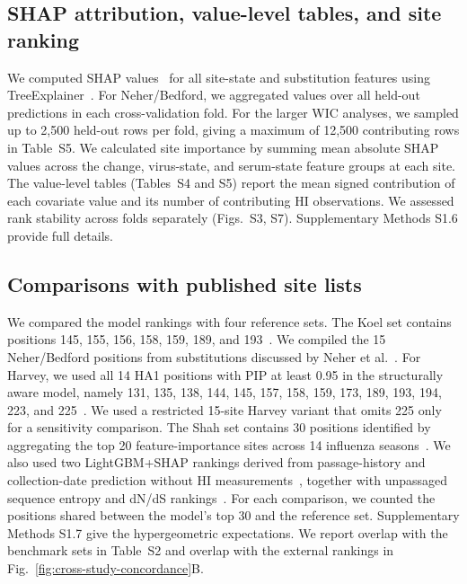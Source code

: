 \documentclass[12pt]{article}
\begin{document}
\subsection{SHAP attribution, value-level tables, and site ranking}

We computed SHAP values~\cite{Lundberg2017} for all site-state and substitution features using TreeExplainer~\cite{Lundberg2020NatMachIntell}. For Neher/Bedford, we aggregated values over all held-out predictions in each cross-validation fold. For the larger WIC analyses, we sampled up to 2{,}500 held-out rows per fold, giving a maximum of 12{,}500 contributing rows in Table~S5. We calculated site importance by summing mean absolute SHAP values across the change, virus-state, and serum-state feature groups at each site. The value-level tables (Tables~S4 and S5) report the mean signed contribution of each covariate value and its number of contributing HI observations. We assessed rank stability across folds separately (Figs.~S3, S7). Supplementary Methods S1.6 provide full details.

\subsection{Comparisons with published site lists}

We compared the model rankings with four reference sets. The Koel set contains positions 145, 155, 156, 158, 159, 189, and 193~\cite{Koel2013Science}. We compiled the 15 Neher/Bedford positions from substitutions discussed by Neher et al.~\cite{Neher2016PNAS}. For Harvey, we used all 14 HA1 positions with PIP at least 0.95 in the structurally aware model, namely 131, 135, 138, 144, 145, 157, 158, 159, 173, 189, 193, 194, 223, and 225~\cite{Harvey2023PLoSComputBiol}. We used a restricted 15-site Harvey variant that omits 225 only for a sensitivity comparison. The Shah set contains 30 positions identified by aggregating the top 20 feature-importance sites across 14 influenza seasons~\cite{shah2024seasonal}. We also used two LightGBM+SHAP rankings derived from passage-history and collection-date prediction without HI measurements~\cite{Meyer2026Interface_sequenceML}, together with unpassaged sequence entropy and dN/dS rankings~\cite{McWhite2016VE_passage, Meyer2015PP_geom}. For each comparison, we counted the positions shared between the model's top 30 and the reference set. Supplementary Methods S1.7 give the hypergeometric expectations. We report overlap with the benchmark sets in Table~S2 and overlap with the external rankings in Fig.~\ref{fig:cross-study-concordance}B.
\end{document}
